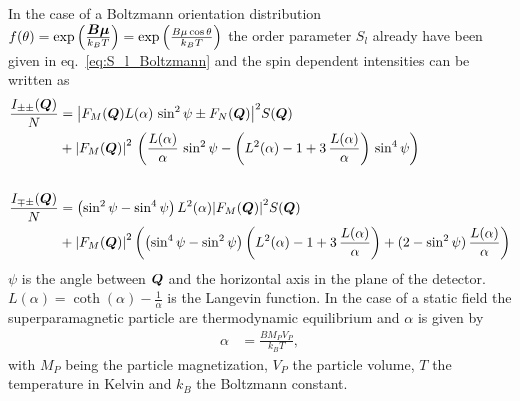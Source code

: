 In the case of a Boltzmann orientation distribution
$f(\theta)=\exp\left(\frac{\BM{B\mu}}{k_BT}\right)=\exp\left(\frac{B\mu\cos\theta}{k_BT}\right)$
the order parameter $S_l$ already have been given in eq.\
\ref{eq:S_l_Boltzmann} and the spin dependent intensities can be
written as
\begin{subequations}
\begin{align}
\frac{I_{\pm\pm}(\BM{Q})}{N} &= \abs{F_M(\BM{Q})
L(\alpha)\,\sin^2\psi
     \pm F_N(\BM{Q})}^2 S(\BM{Q}) \\
&+ \abs{F_M(\BM{Q})}^2\, \left( \frac{L(\alpha)}{\alpha}\,
\sin^2\psi - \left( L^2(\alpha)-1+3\,\frac{L(\alpha)}{\alpha}\right)
\, \sin^4\psi \right) \nonumber \\
\nonumber \\
\frac{I_{\mp\pm}(\BM{Q})}{N} &= \left( \sin^2\psi - \sin^4\psi
\right) L^2(\alpha)
\abs{F_M(\BM{Q})}^2 S(\BM{Q}) \\
&+ \abs{F_M(\BM{Q})}^2  \left( \left( \sin^4\psi-\sin^2\psi \right)
\left( L^2(\alpha)-1+3\, \frac{L(\alpha)}{\alpha}\right) +
(2-\sin^2\psi)\, \frac{L(\alpha)}{\alpha}\right) \nonumber
\end{align}
\end{subequations}
$\psi$ is the angle between $\BM{Q}$ and the horizontal axis in the
plane of the detector. $L(\alpha)=\coth(\alpha)-\frac{1}{\alpha}$ is
the Langevin function. In the case of a static field the
superparamagnetic particle are thermodynamic equilibrium and
$\alpha$ is given by
\begin{align}
\alpha&=\frac{BM_PV_P}{k_B T},
\end{align}
with $M_P$ being the particle magnetization, $V_P$ the particle
volume, $T$ the temperature in Kelvin and $k_B$ the Boltzmann
constant.
\clearpage